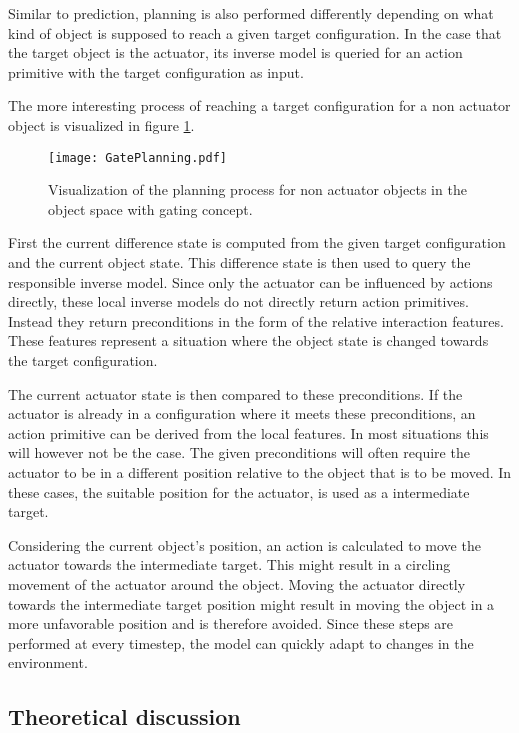 Similar to prediction, planning is also performed differently depending on what kind of object is supposed to reach a given target configuration. In the case that the target object is the actuator, its inverse model is queried for an action primitive with the target configuration as input. 

The more interesting process of reaching a target configuration for a non actuator object is visualized in figure \ref{fig:GatePlanning}.

\begin{figure}
	\centering
	\texttt{[image: GatePlanning.pdf]}
	\caption{Visualization of the planning process for non actuator objects in the object space with gating concept. }%
		\label{fig:GatePlanning}
\end{figure}
	
First the current difference state is computed from the given target configuration and the current object state. This difference state is then used to query the responsible inverse model. Since only the actuator can be influenced by actions directly, these local inverse models do not directly return action primitives. Instead they return preconditions in the form of the relative interaction features. These features represent a situation where the object state is changed towards the target configuration. 
	
The current actuator state is then compared to these preconditions. If the actuator is already in a configuration where it meets these preconditions, an action primitive can be derived from the local features. In most situations this will however not be the case. The given preconditions will often require the actuator to be in a different position relative to the object that is to be moved. In these cases, the suitable position for the actuator, is used as a intermediate target. 

Considering the current object's position, an action is calculated to move the actuator towards the intermediate target. This might result in a circling movement of the actuator around the object. Moving the actuator directly towards the intermediate target position might result in moving the object in a more unfavorable position and is therefore avoided. Since these steps are performed at every timestep, the model can quickly adapt to changes in the environment.
	
\subsection{Theoretical discussion}

